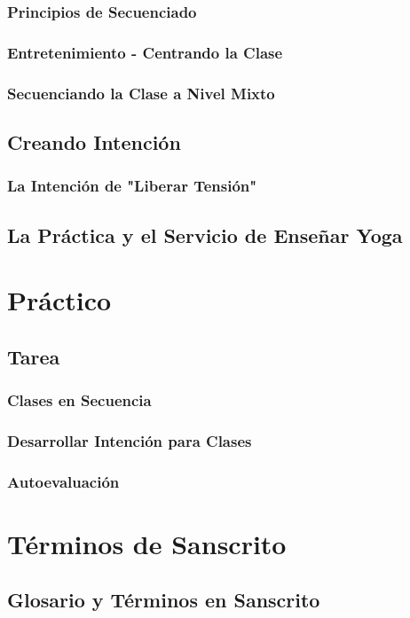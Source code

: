 \documentclass[11pt]{book}
\begin{document}
\subsection{Principios de Secuenciado}
\subsection{Entretenimiento - Centrando la Clase}
\subsection{Secuenciando la Clase a Nivel Mixto}
\section{Creando Intención}
\subsection{La Intención de "Liberar Tensión"}
\section{La Práctica y el Servicio de Enseñar Yoga}

\chapter{Práctico}
\section{Tarea}
\subsection{Clases en Secuencia}
\subsection{Desarrollar Intención para Clases}
\subsection{Autoevaluación}

\chapter{Términos de Sanscrito}
\section{Glosario y Términos en Sanscrito}
\end{document}
